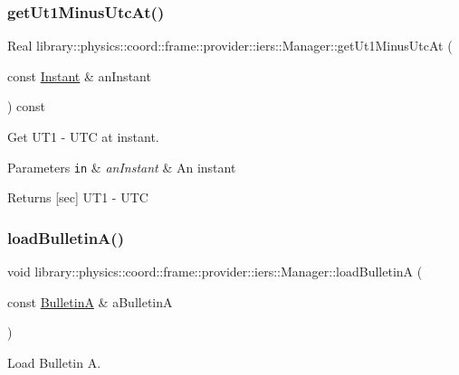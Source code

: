 \subsubsection{\texorpdfstring{get\+Ut1\+Minus\+Utc\+At()}{getUt1MinusUtcAt()}}
{\footnotesize\ttfamily Real library\+::physics\+::coord\+::frame\+::provider\+::iers\+::\+Manager\+::get\+Ut1\+Minus\+Utc\+At (\begin{DoxyParamCaption}\item[{const \hyperlink{classlibrary_1_1physics_1_1time_1_1_instant}{Instant} \&}]{an\+Instant }\end{DoxyParamCaption}) const}



Get U\+T1 -\/ U\+TC at instant. 


\begin{DoxyParams}[1]{Parameters}
\mbox{\tt in}  & {\em an\+Instant} & An instant \\
\hline
\end{DoxyParams}
\begin{DoxyReturn}{Returns}
\mbox{[}sec\mbox{]} U\+T1 -\/ U\+TC 
\end{DoxyReturn}
\mbox{\label{classlibrary_1_1physics_1_1coord_1_1frame_1_1provider_1_1iers_1_1_manager_a7842650adf502ff5de1889bb6301c319}} 
\subsubsection{\texorpdfstring{load\+Bulletin\+A()}{loadBulletinA()}}
{\footnotesize\ttfamily void library\+::physics\+::coord\+::frame\+::provider\+::iers\+::\+Manager\+::load\+BulletinA (\begin{DoxyParamCaption}\item[{const \hyperlink{classlibrary_1_1physics_1_1coord_1_1frame_1_1provider_1_1iers_1_1_bulletin_a}{BulletinA} \&}]{a\+BulletinA }\end{DoxyParamCaption})}



Load Bulletin A. 


